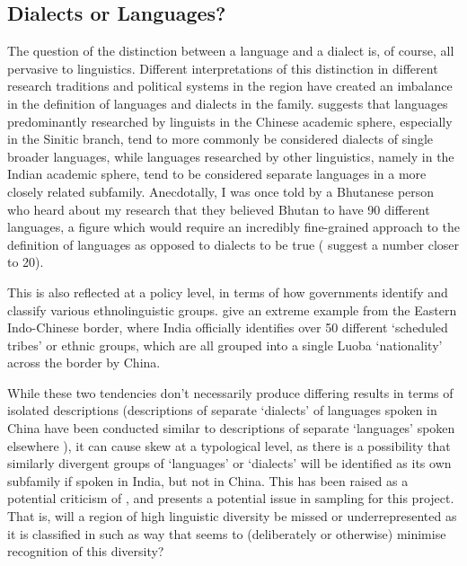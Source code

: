 \subsection{Dialects or Languages?}\label{s:DialectsorLanguages}
The question of the distinction between a language and a dialect is, of course, all pervasive to linguistics. Different interpretations of this distinction in different research traditions and political systems in the region have created an imbalance in the definition of languages and dialects in the family.  suggests that languages predominantly researched by linguists in the Chinese academic sphere, especially in the Sinitic branch, tend to more commonly be considered dialects of single broader languages, while languages researched by other linguistics, namely in the Indian academic sphere, tend to be considered separate languages in a more closely related subfamily. Anecdotally, I was once told by a Bhutanese person who heard about my research that they believed Bhutan to have 90 different languages, a figure which would require an incredibly fine-grained approach to the definition of languages as opposed to dialects to be true ( suggest a number closer to 20).

This is also reflected at a policy level, in terms of how governments identify and classify various ethnolinguistic groups.  give an extreme example from the Eastern Indo-Chinese border, where India officially identifies over 50 different `scheduled tribes' or ethnic groups, which are all grouped into a single Luoba `nationality' across the border by China.

While these two tendencies don't necessarily produce differing results in terms of isolated descriptions (descriptions of separate `dialects' of languages spoken in China have been conducted similar to descriptions of separate `languages' spoken elsewhere \cites{Lai2017}{TaylorAdams2020}), it can cause skew at a typological level, as there is a possibility that similarly divergent groups of `languages' or `dialects' will be identified as its own subfamily if spoken in India, but not in China. This has been raised as a potential criticism of  \cite{LaPolla2016}, and presents a potential issue in sampling for this project. That is, will a region of high linguistic diversity be missed or underrepresented as it is classified in such as way that seems to (deliberately or otherwise) minimise recognition of this diversity?


